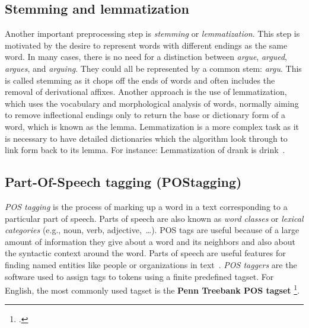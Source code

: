 \subsection{Stemming and  lemmatization}
Another important preprocessing step is \emph{stemming} or \emph{lemmatization}. This step is motivated by the desire to represent words with different endings as the same word.
In many cases, there is no need for a distinction between \emph{argue}, \emph{argued}, \emph{argues}, and \emph{arguing}. They could all be represented by a common stem: \emph{argu}. This is called stemming as it chops off the ends of words and often includes the removal of derivational affixes. Another approach is the use of lemmatization, which uses the vocabulary and morphological analysis of words, normally aiming to remove inflectional endings only\added{,}  to return the base or dictionary form of a word, which is known as the lemma. Lemmatization is a more complex task as it is necessary to have detailed dictionaries which the algorithm  look through to link  form back to its lemma. For instance:
Lemmatization of drank is drink~.

\subsection{Part-Of-Speech tagging (POStagging)}
\emph{POS tagging} is the process of marking up a word in a text corresponding to a particular part of speech. Parts of speech are also known as \emph{word classes} or \emph{lexical categories} (e.g., noun, verb, adjective,~\dots). POS tags are useful because of a large amount of information they give about a word and its neighbors and also about the syntactic context around the word. Parts of speech are useful features for finding named entities like people or organizations in text~. \emph{POS taggers} are the software used to assign tags to tokens using a finite predefined tagset. For English, the most commonly used tagset is the \textbf{Penn Treebank POS tagset} \footcite{https://www.ling.upenn.edu/courses/Fall_2003/ling001/penn_treebank_pos.html}. 
